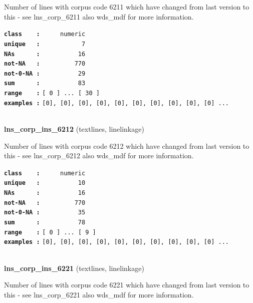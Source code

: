 \documentclass[]{article}
\begin{document}
Number of lines with corpus code 6211 which have changed from last
version to this - see lns\_corp\_6211 also wds\_mdf for more
information.

\textbf{\texttt{class\ \ \ \ :}} \texttt{~~~~~numeric}\\
\textbf{\texttt{unique\ \ \ :}} \texttt{~~~~~~~~~~~7}\\
\textbf{\texttt{NAs\ \ \ \ \ \ :}} \texttt{~~~~~~~~~~16}\\
\textbf{\texttt{not-NA\ \ \ :}} \texttt{~~~~~~~~~770}\\
\textbf{\texttt{not-0-NA\ :}} \texttt{~~~~~~~~~~29}\\
\textbf{\texttt{sum\ \ \ \ \ \ :}} \texttt{~~~~~~~~~~83}\\
\textbf{\texttt{range\ \ \ \ :}}
\texttt{{[}\ 0\ {]}\ ...\ {[}\ 30\ {]}}\\
\textbf{\texttt{examples\ :}}
\texttt{{[}0{]},\ {[}0{]},\ {[}0{]},\ {[}0{]},\ {[}0{]},\ {[}0{]},\ {[}0{]},\ {[}0{]},\ {[}0{]},\ {[}0{]}\ ...}\\

~

\textbf{lns\_corp\_ins\_6212} (textlines, linelinkage)

Number of lines with corpus code 6212 which have changed from last
version to this - see lns\_corp\_6212 also wds\_mdf for more
information.

\textbf{\texttt{class\ \ \ \ :}} \texttt{~~~~~numeric}\\
\textbf{\texttt{unique\ \ \ :}} \texttt{~~~~~~~~~~10}\\
\textbf{\texttt{NAs\ \ \ \ \ \ :}} \texttt{~~~~~~~~~~16}\\
\textbf{\texttt{not-NA\ \ \ :}} \texttt{~~~~~~~~~770}\\
\textbf{\texttt{not-0-NA\ :}} \texttt{~~~~~~~~~~35}\\
\textbf{\texttt{sum\ \ \ \ \ \ :}} \texttt{~~~~~~~~~~78}\\
\textbf{\texttt{range\ \ \ \ :}}
\texttt{{[}\ 0\ {]}\ ...\ {[}\ 9\ {]}}\\
\textbf{\texttt{examples\ :}}
\texttt{{[}0{]},\ {[}0{]},\ {[}0{]},\ {[}0{]},\ {[}0{]},\ {[}0{]},\ {[}0{]},\ {[}0{]},\ {[}0{]},\ {[}0{]}\ ...}\\

~

\textbf{lns\_corp\_ins\_6221} (textlines, linelinkage)

Number of lines with corpus code 6221 which have changed from last
version to this - see lns\_corp\_6221 also wds\_mdf for more
information.
\end{document}

